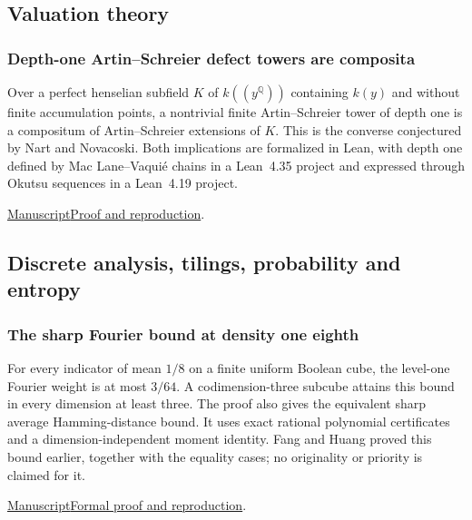 \documentclass[11pt,a4paper]{article}
\begin{document}
\subsection{Valuation theory}

\subsubsection{Depth-one Artin--Schreier defect towers are composita}

Over a perfect henselian subfield $K$ of $k((y^{\mathbb Q}))$ containing $k(y)$ and without finite accumulation points, a nontrivial finite Artin--Schreier tower of depth one is a compositum of Artin--Schreier extensions of $K$. This is the converse conjectured by Nart and Novacoski. Both implications are formalized in Lean, with depth one defined by Mac Lane--Vaquié chains in a Lean~4.35 project and expressed through Okutsu sequences in a Lean~4.19 project.

\noindent\href{https://github.com/dvgyl/math-and-theory/blob/main/papers/mathematics/artin-schreier-depth/manuscript.pdf}{Manuscript}\quad\href{https://github.com/dvgyl/math-and-theory/blob/main/papers/mathematics/artin-schreier-depth/README.md}{Proof and reproduction}.

\subsection{Discrete analysis, tilings, probability and entropy}

\subsubsection{The sharp Fourier bound at density one eighth}

For every indicator of mean $1/8$ on a finite uniform Boolean cube, the level-one Fourier weight is at most $3/64$. A codimension-three subcube attains this bound in every dimension at least three. The proof also gives the equivalent sharp average Hamming-distance bound. It uses exact rational polynomial certificates and a dimension-independent moment identity. Fang and Huang proved this bound earlier, together with the equality cases; no originality or priority is claimed for it.

\noindent\href{https://github.com/dvgyl/math-and-theory/blob/main/papers/mathematics/sharp-eighth/manuscript.pdf}{Manuscript}\quad\href{https://github.com/dvgyl/math-and-theory/blob/main/papers/mathematics/sharp-eighth/README.md}{Formal proof and reproduction}.
\end{document}
